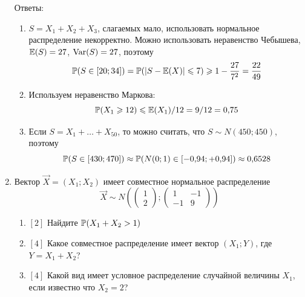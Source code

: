 \documentclass[12pt, a4paper]{article}\usepackage[]{graphicx}\usepackage[]{color}
\begin{document}
\begin{enumerate}
Ответы:
\begin{enumerate}
\item $S=X_1+X_2+X_3$, слагаемых мало, использовать нормальное распределение некорректно. Можно использовать неравенство Чебышева, $\E(S)=27$, $\Var(S)=27$, поэтому
\begin{equation}
\P(S\in [20;34])=\P( |S-\E(X)| \leq 7) \geq 1-\frac{27}{7^2}=\frac{22}{49}
\end{equation}
\item Используем неравенство Маркова:
\begin{equation}
\P(X_1 \geq 12)\leq \E(X_1)/12=9/12=0{,}75
\end{equation}
\item Если $S=X_1+\ldots+X_{50}$, то можно считать, что $S\sim N(450;450)$, поэтому
\begin{equation}
\P(S \in [430;470])\approx \P( N(0;1) \in [-0{,}94;+0{,}94])\approx 0{,}6528
\end{equation}

\end{enumerate}


\item Вектор $\vec{X}=(X_1;X_2)$ имеет совместное нормальное распределение
\begin{equation}
\vec{X}\sim N\left(
\left(\begin{array}{l}
{1} \\
{2}
\end{array}\right);
\left(\begin{array}{cc}
{1} & {-1} \\
{-1} & {9}
\end{array}\right)
\right)
\end{equation}
\begin{enumerate}
\item $[2]$ Найдите $\P(X_1+X_2>1)$
\item $[4]$ Какое совместное распределение имеет вектор $(X_1;Y)$, где $Y=X_1+X_2$?
\item $[4]$ Какой вид имеет условное распределение случайной величины $X_1$, если известно что $X_2=2$?
\end{enumerate}



\end{enumerate}
\end{document}
